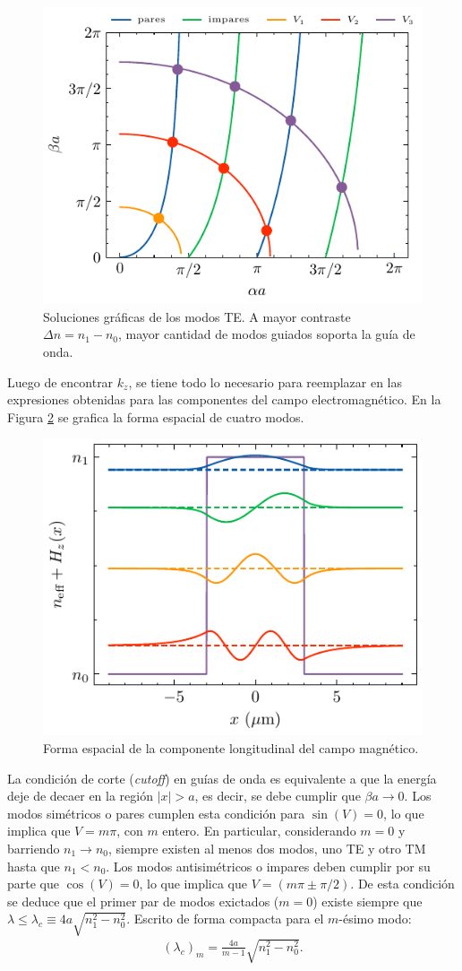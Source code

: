 \begin{figure}[H]
	\centering
	\includegraphics[width=0.7\linewidth]{media/slabgraphical.pdf}
	\caption[Soluciones gráficas de los modos TE]{Soluciones gráficas de los modos TE. A mayor contraste $\Delta n = n_1-n_0$, mayor cantidad de modos guiados soporta la guía de onda. \label{fig:graphTE}}
\end{figure}
Luego de encontrar $k_z$, se tiene todo lo necesario para reemplazar en las expresiones obtenidas para las componentes del campo electromagnético. En la Figura \ref{fig:E-slab-graph} se grafica la forma espacial de cuatro modos.
\begin{figure}[H]
	\centering
	\includegraphics[width=0.7\linewidth]{media/TETMfields.pdf}
	\caption[Forma espacial de la componente longitudinal del campo magnético.]{ Forma espacial de la componente longitudinal del campo magnético. \label{fig:E-slab-graph}}
\end{figure}

La condición de corte (\textit{cutoff}) en guías de onda es equivalente a que la energía deje de decaer en la región $|x| > a$, es decir, se debe cumplir que $\beta a \to 0$. 
Los modos simétricos o pares cumplen esta condición para $\sin(V) = 0$, lo que implica que $V = m \pi$, con $m$ entero. En particular, considerando $m=0$  y barriendo $n_1 \to n_0$, siempre existen al menos dos modos, uno TE y otro TM hasta que $n_1 < n_0$.  
Los modos antisimétricos o impares deben cumplir por su parte que $\cos(V) = 0$, lo que implica que $V = (m\pi \pm \pi/2)$. De esta condición se deduce que el primer par de modos exictados ($m=0$) existe siempre que $\lambda \le \lambda_c \equiv 4a\sqrt{n_1^2-n_0^2}$. Escrito de forma compacta para el $m$-ésimo modo:
\begin{align*}
	 (\lambda_c)_m = \frac{4a}{m-1}  \sqrt{n_1^2-n_0^2}.
\end{align*}

